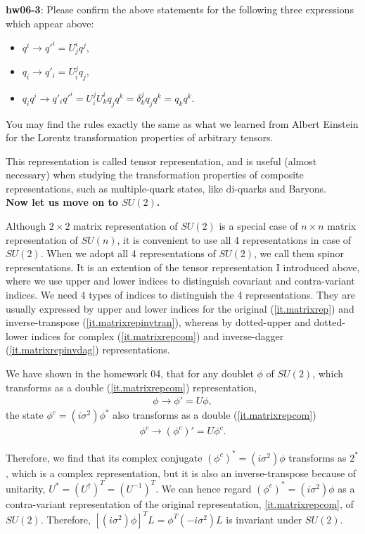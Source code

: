\documentclass[12pt]{article}
\begin{document}
{\bf hw06-3}: Please confirm the above statements for the following
  three expressions which appear above:
\begin{itemize}
  \item $ q^i \to q'^i = U^i_j q^j$,
  \item $ q_i \to q'_i = U_i^j q_j$,
  \item $  q_i q^i \to q'_i q'^i =  U_i^j U^i_k  q_j q^k =  \delta^j_k  q_j q^k =  q_k q^k$.
\end{itemize}
 
  You may find the rules exactly the same as what we learned
  from Albert Einstein for the Lorentz transformation properties
  of arbitrary tensors.

  This representation is called tensor representation, and
  is useful (almost necessary) when studying the transformation
  properties of composite representations, such as multiple-quark
  states, like di-quarks and Baryons.\\


 {\bf  Now let us move on to $SU(2)$.}

  Although $2 \times 2$ matrix representation of $SU(2)$ is a special case of
  $n \times n$ matrix representation of $SU(n)$, it is convenient to use all
  4 representations in case of $SU(2)$.  When we adopt all 4
  representations of $SU(2)$, we call them spinor representations.
  It is an extention of the tensor representation I introduced
  above, where we use upper and lower indices to distinguish
  covariant and contra-variant indices.  We need 4 types of indices
  to distinguish the 4 representations.  They are usually expressed
  by upper and lower indices for the original (\ref{it.matrixrep}) and
  inverse-transpose (\ref{it.matrixrepinvtran}), whereas by dotted-upper and dotted-lower
  indices for complex (\ref{it.matrixrepcom}) and inverse-dagger (\ref{it.matrixrepinvdag}) representations.

  We have shown in the homework 04, that for any doublet
  $\phi$ of $SU(2)$, which transforms as a double (\ref{it.matrixrepcom}) representation,
  \begin{eqnarray}
    \phi \to \phi' = U \phi,
  \end{eqnarray}
  the state
  $\phi^c = (i\sigma^2) \phi^*$
  also transforms as a double (\ref{it.matrixrepcom})
  \begin{eqnarray}
  \phi^c \to (\phi^c)' = U \phi^c.
  \end{eqnarray}

  Therefore, we find that its complex conjugate
  $(\phi^c)^* = (i\sigma^2) \phi$
  transforms as $2^*$, which is a complex representation,
  but it is also an inverse-transpose because of unitarity,
  $U^* = (U^\dagger)^T = (U^{-1})^T$.
  We can hence regard
  $(\phi^c)^* = (i\sigma^2) \phi$
  as a contra-variant representation of the original
  representation, \ref{it.matrixrepcom}, of $SU(2)$. Therefore,
  $[(i\sigma^2) \phi]^T L = \phi^T (-i\sigma^2) L$
  is invariant under $SU(2)$.
\end{document}
